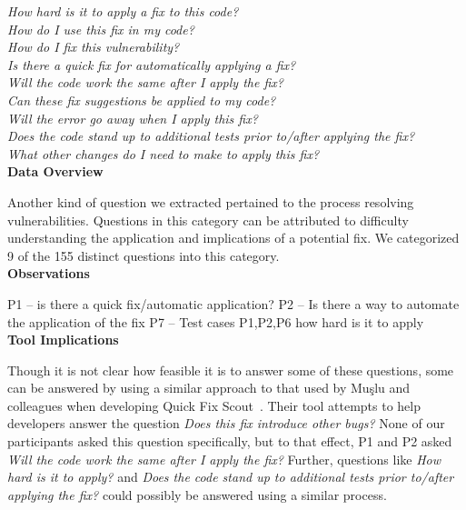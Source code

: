 \documentclass[conference]{IEEEtran}
\begin{document}
\noindent\emph{How hard is it to apply a fix to this code?} \\
\emph{How do I use this fix in my code?} \\
\emph{How do I fix this vulnerability?} \\
\emph{Is there a quick fix for automatically applying a fix?} \\
\emph{Will the code work the same after I apply the fix?} \\
\emph{Can these fix suggestions be applied to my code?} \\
\emph{Will the error go away when I apply this fix?} \\
\emph{Does the code stand up to additional tests prior to/after applying the fix?} \\
\emph{What other changes do I need to make to apply this fix?} \\


\noindent\textbf{Data Overview}

Another kind of question we extracted pertained to the process resolving vulnerabilities. 
Questions in this category can be attributed to difficulty understanding the application and implications of a potential fix. 
We categorized 9 of the 155 distinct questions into this category.
\\

\noindent\textbf{Observations}

P1 -- is there a quick fix/automatic application?
P2 -- Is there a way to automate the application of the fix
P7 -- Test cases
P1,P2,P6 how hard is it to apply
\\

\noindent\textbf{Tool Implications}

Though it is not clear how feasible it is to answer some of these questions, some can be answered by using a similar approach to that used by Mu{\c{s}}lu and colleagues when developing Quick Fix Scout~\cite{mucslu2012speculative}. 
Their tool attempts to help developers answer the question \textit{Does this fix introduce other bugs?} 
None of our participants asked this question specifically, but to that effect, P1 and P2 asked \textit{Will the code work the same after I apply the fix?} 
Further, questions like \textit{How hard is it to apply?} and \textit{Does the code stand up to additional tests prior to/after applying the fix?} could possibly be answered using a similar process.

\end{document}
